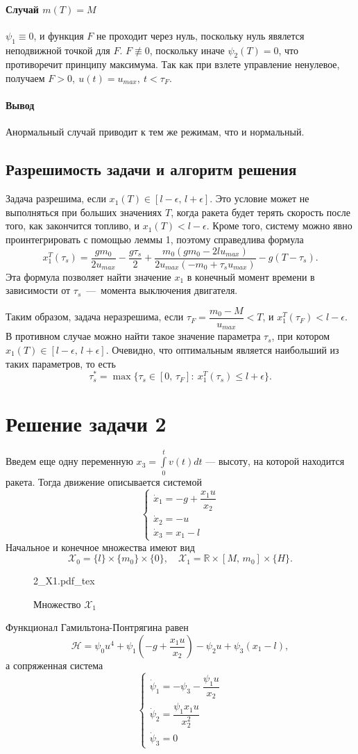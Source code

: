 \documentclass[16pt]{article}
\newcommand{\incfig}[2]{%
    \def\svgwidth{#2 mm}
    {#1.pdf_tex}
}
\newcommand\Real{\mathbb{R}}
\newcommand\Int[2]{\int\limits_{#1}^{#2}}
\newcommand\X{\mathcal{X}}
\newcommand\Pict[3]{
\begin{figure}[h!]
    \centering
    \incfig{#1}{#3}
    \caption{#2}
    \label{fig:#1}
\end{figure}
}
\begin{document}
\paragraph{Случай $m(T) = M$} $\psi_1 \equiv 0$, и функция $F$ не проходит через нуль,
поскольку нуль явялется неподвижной точкой для $F$. $F \not\equiv 0$, поскольку иначе $\psi_2(T) = 0$, что 
противоречит принципу максимума. Так как при взлете управление ненулевое, получаем $F > 0, \ u(t) = u_{max},
\ t < \tau_F.$
\paragraph{Вывод}
Анормальный случай приводит к тем же режимам, что и нормальный.
\subsection{Разрешимость задачи и алгоритм решения}
Задача разрешима, если $x_1(T) \in [l - \epsilon,\, l + \epsilon]$. Это условие может не выполняться при больших 
значениях $T$, когда ракета будет терять скорость после того, как закончится топливо, и $x_1(T) < l - \epsilon$.
Кроме того, систему можно явно проинтегрировать с помощью леммы 1, поэтому справедлива формула
$$x_{1}^T(\tau_s) = \dfrac{gm_0}{2u_{max}} - \dfrac{g\tau_s}{2} +
 \dfrac{m_0(gm_0 - 2lu_{max})}{2u_{max}(-m_0 + \tau_su_{max})} - g(T - \tau_s).$$
Эта формула позволяет найти значение $x_1$ в конечный момент времени в зависимости от
$\tau_s$~---~момента выключения двигателя.

Таким образом, задача неразрешима, если $\tau_F = \dfrac{m_0 - M}{u_{max}} < T$, и
$x_{1}^T(\tau_F) < l - \epsilon$. В противном случае можно найти такое значение параметра $\tau_s$, при котором
$x_1(T) \in [l - \epsilon,\,l+\epsilon].$ Очевидно, что оптимальным является наибольший из таких параметров, то есть
$$\tau_s^* = \max\{\tau_s \in [0,\, \tau_F]\colon\  x_1^T(\tau_s) \leqslant l + \epsilon\}.$$

\section{Решение задачи 2}
Введем еще одну переменную $x_3 = \Int{0}{t}v(t)dt$ --- высоту, на которой находится ракета.
 Тогда движение описывается системой
\begin{equation}
\begin{cases} \label{rocket_ode2}
\dot{x}_1 = -g + \dfrac{x_1u}{x_2} \\
\dot{x}_2 = -u \\
\dot{x}_3 = x_1 - l
\end{cases} 
\end{equation}
Начальное и конечное множества имеют вид
$$\X_0 =\{l\}\times\{m_0\}\times\{0\}, \quad \X_1 = \Real \times [M,\,m_0] \times \{H\}.$$
\Pict{2_X1}{Множество $\X_1$}{90}
Функционал Гамильтона-Понтрягина равен 
$$\mathcal{H} = \psi_0 u^4 + \psi_1(-g + \dfrac{x_1u}{x_2}) - \psi_2u + \psi_3(x_1 - l),$$
а сопряженная система 
$$
\begin{cases}
\dot{\psi}_1 = -\psi_3 -\dfrac{\psi_1u}{x_2}\\
\dot{\psi}_2 = \dfrac{\psi_1 x_1 u}{x_2^2} \\
\dot{\psi}_3 = 0
\end{cases}
$$
\end{document}
